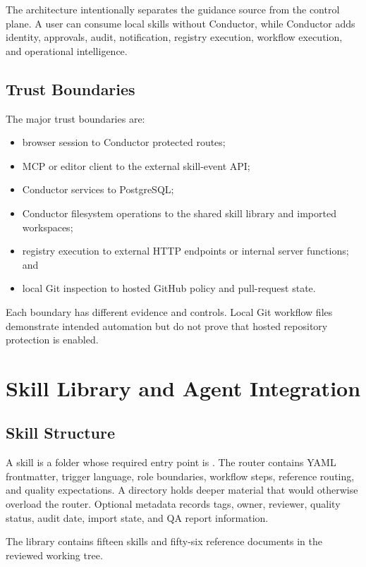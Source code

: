 \documentclass[12pt]{report}
\begin{document}
The architecture intentionally separates the guidance source from the control plane. A user can consume local skills without Conductor, while Conductor adds identity, approvals, audit, notification, registry execution, workflow execution, and operational intelligence.

\section{Trust Boundaries}

The major trust boundaries are:

\begin{itemize}
  \item browser session to Conductor protected routes;
  \item MCP or editor client to the external skill-event API;
  \item Conductor services to PostgreSQL;
  \item Conductor filesystem operations to the shared skill library and imported workspaces;
  \item registry execution to external HTTP endpoints or internal server functions; and
  \item local Git inspection to hosted GitHub policy and pull-request state.
\end{itemize}

Each boundary has different evidence and controls. Local Git workflow files demonstrate intended automation but do not prove that hosted repository protection is enabled.

\chapter{Skill Library and Agent Integration}

\section{Skill Structure}

A skill is a folder whose required entry point is . The router contains YAML frontmatter, trigger language, role boundaries, workflow steps, reference routing, and quality expectations. A  directory holds deeper material that would otherwise overload the router. Optional  metadata records tags, owner, reviewer, quality status, audit date, import state, and QA report information.

The library contains fifteen skills and fifty-six reference documents in the reviewed working tree.
\end{document}
